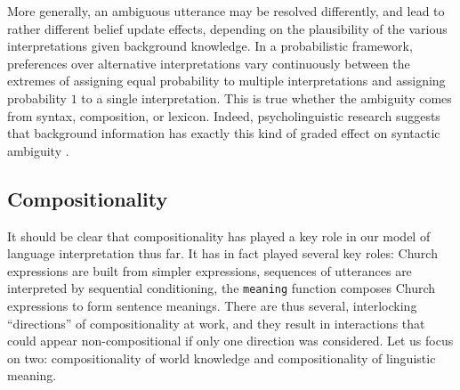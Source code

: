 \documentclass[pdfextras]{handbook}
\begin{document}
More generally, an ambiguous utterance may be resolved differently, and lead to rather different belief update effects, depending on the plausibility of the various interpretations given background knowledge. In a probabilistic framework, preferences over alternative interpretations vary continuously between the extremes of assigning equal probability to multiple interpretations and assigning probability $1$ to a single interpretation.
This is true whether the ambiguity comes from syntax, composition, or lexicon. 
Indeed, psycholinguistic research suggests that background information has exactly this kind of graded effect 
on syntactic ambiguity \citep{crain1985not,altmann1988interaction,spivey2002eye}.
%
%





\subsection{Compositionality}

It should be clear that compositionality has played a key role in our model of language interpretation thus far. It has in fact played several key roles: Church expressions are built from simpler expressions, sequences of utterances are interpreted by sequential conditioning, the \lstinline{meaning} function composes Church expressions to form sentence meanings. There are thus several, interlocking ``directions'' of compositionality at work, and they result in interactions that could appear non-compositional if only one direction was considered. Let us focus on two: compositionality of world knowledge and compositionality of linguistic meaning.
\end{document}
